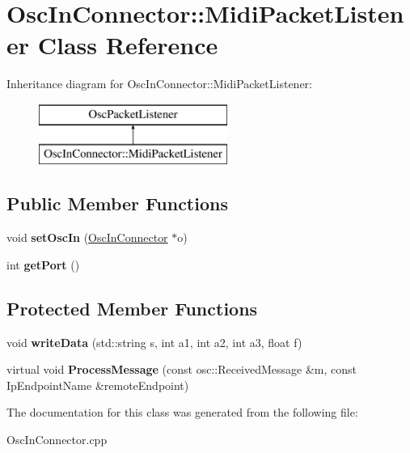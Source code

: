 \hypertarget{classOscInConnector_1_1MidiPacketListener}{}\section{Osc\+In\+Connector\+:\+:Midi\+Packet\+Listener Class Reference}
\label{classOscInConnector_1_1MidiPacketListener}
Inheritance diagram for Osc\+In\+Connector\+:\+:Midi\+Packet\+Listener\+:\begin{figure}[H]
\begin{center}
\leavevmode
\includegraphics[height=2.000000cm]{classOscInConnector_1_1MidiPacketListener}
\end{center}
\end{figure}
\subsection*{Public Member Functions}
\begin{DoxyCompactItemize}
\item 
void {\bfseries set\+Osc\+In} (\hyperlink{classOscInConnector}{Osc\+In\+Connector} $\ast$o)\hypertarget{classOscInConnector_1_1MidiPacketListener_ab4e0346cad409b3871add20bc5c8c904}{}\label{classOscInConnector_1_1MidiPacketListener_ab4e0346cad409b3871add20bc5c8c904}

\item 
int {\bfseries get\+Port} ()\hypertarget{classOscInConnector_1_1MidiPacketListener_affd65358cd1ffcde113576b8023fa8d6}{}\label{classOscInConnector_1_1MidiPacketListener_affd65358cd1ffcde113576b8023fa8d6}

\end{DoxyCompactItemize}
\subsection*{Protected Member Functions}
\begin{DoxyCompactItemize}
\item 
void {\bfseries write\+Data} (std\+::string s, int a1, int a2, int a3, float f)\hypertarget{classOscInConnector_1_1MidiPacketListener_a6ad19bb71d7d360d432eecd4d2f8aa0f}{}\label{classOscInConnector_1_1MidiPacketListener_a6ad19bb71d7d360d432eecd4d2f8aa0f}

\item 
virtual void {\bfseries Process\+Message} (const osc\+::\+Received\+Message \&m, const Ip\+Endpoint\+Name \&remote\+Endpoint)\hypertarget{classOscInConnector_1_1MidiPacketListener_ad5b4e469c87859e8577d2bf77aaa66bd}{}\label{classOscInConnector_1_1MidiPacketListener_ad5b4e469c87859e8577d2bf77aaa66bd}

\end{DoxyCompactItemize}


The documentation for this class was generated from the following file\+:\begin{DoxyCompactItemize}
\item 
Osc\+In\+Connector.\+cpp\end{DoxyCompactItemize}
